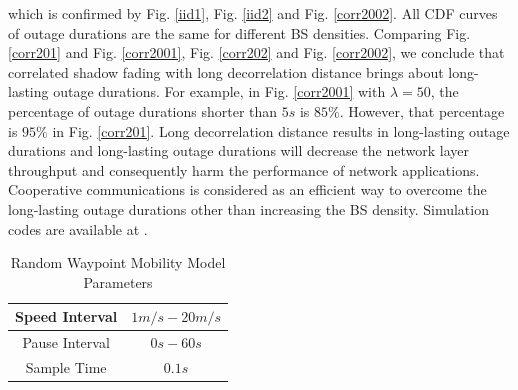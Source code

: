 \documentclass[journal,10pt]{IEEEtran}
\begin{document}
which is confirmed by Fig. \ref{iid1}, Fig. \ref{iid2} and Fig. \ref{corr2002}. All CDF curves of outage durations are the same for different BS densities. Comparing Fig. \ref{corr201} and Fig. \ref{corr2001}, Fig. \ref{corr202} and Fig. \ref{corr2002}, we conclude that correlated shadow fading with long decorrelation distance brings about long-lasting outage durations. For example, in Fig. \ref{corr2001} with $\lambda = 50$, the percentage of outage durations shorter than $5s$ is $85\%$. However, that percentage is $95\%$ in Fig. \ref{corr201}. Long decorrelation distance results in long-lasting outage durations and long-lasting outage durations will decrease the network layer throughput and consequently harm the performance of network applications. Cooperative communications \cite{lu2015shining} is considered as an efficient way to overcome the long-lasting outage durations other than increasing the BS density. Simulation codes are available at \cite{website1}.
 \begin{table}
 \centering
 \caption{\label{RWP}Random Waypoint Mobility Model Parameters}

 \begin{tabular}{|c|c|}

 \hline
 Speed Interval & $1m/s - 20m/s$\\
 \hline
 Pause Interval & $0s - 60s$\\
 \hline
 Sample Time & $0.1s$\\
 \hline
 \end{tabular}

 \end{table}
\end{document}
